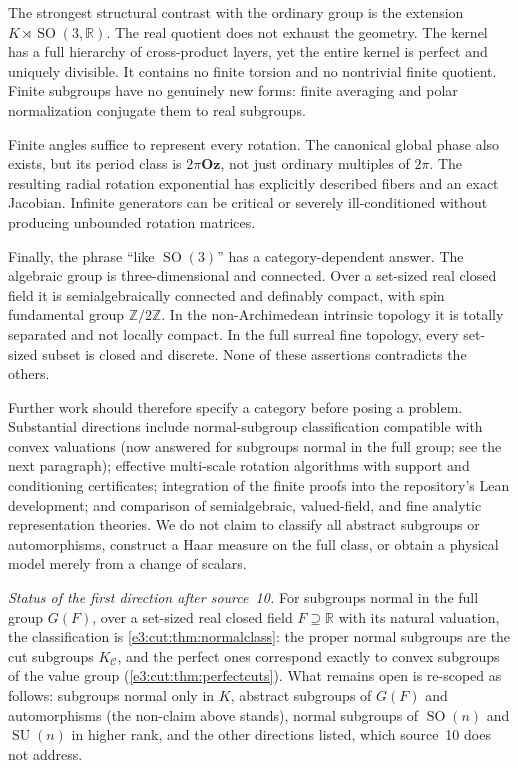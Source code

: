 \documentclass[11pt,letterpaper]{article}
\numberwithin{equation}{section}
\theoremstyle{definition}
\theoremstyle{remark}
\newcommand{\R}{\mathbb R}
\newcommand{\Z}{\mathbb Z}
\newcommand{\Oz}{\mathbf{Oz}}
\newcommand{\SO}{\operatorname{SO}}
\newcommand{\SU}{\operatorname{SU}}
\begin{document}
The strongest structural contrast with the ordinary group is the extension
\(K\rtimes\SO(3,\R)\). The real quotient does not exhaust the geometry.
The kernel has a full hierarchy of cross-product layers, yet the entire kernel
is perfect and uniquely divisible. It contains no finite torsion and no
nontrivial finite quotient. Finite subgroups have no genuinely new forms:
finite averaging and polar normalization conjugate them to real subgroups.

Finite angles suffice to represent every rotation. The canonical global phase
also exists, but its period class is \(2\pi\Oz\), not just ordinary multiples
of \(2\pi\). The resulting radial rotation exponential has explicitly described
fibers and an exact Jacobian. Infinite generators can be critical or severely
ill-conditioned without producing unbounded rotation matrices.

Finally, the phrase ``like \(\SO(3)\)'' has a category-dependent answer. The
algebraic group is three-dimensional and connected. Over a set-sized real closed
field it is semialgebraically connected and definably compact, with spin
fundamental group \(\Z/2\Z\). In the non-Archimedean intrinsic topology it is
totally separated and not locally compact. In the full surreal fine topology,
every set-sized subset is closed and discrete. None of these assertions
contradicts the others.

Further work should therefore specify a category before posing a problem.
Substantial directions include normal-subgroup classification compatible with
convex valuations (now answered for subgroups normal in the full group; see the
next paragraph); effective multi-scale rotation algorithms with support and
conditioning certificates; integration of the finite proofs into the
repository's Lean development; and comparison of semialgebraic, valued-field,
and fine analytic representation theories. We do not claim to classify all
abstract subgroups or automorphisms, construct a Haar measure on the full class,
or obtain a physical model merely from a change of scalars.

\emph{Status of the first direction after source~10.} For subgroups normal in
the full group $G(F)$, over a set-sized real closed field $F\supseteq\R$ with its
natural valuation, the classification is \cref{e3:cut:thm:normalclass}: the
proper normal subgroups are the cut subgroups $K_{\mathcal C}$, and the perfect
ones correspond exactly to convex subgroups of the value group
(\cref{e3:cut:thm:perfectcuts}). What remains open is re-scoped as follows:
subgroups normal only in $K$, abstract subgroups of $G(F)$ and automorphisms
(the non-claim above stands), normal subgroups of $\SO(n)$ and $\SU(n)$ in
higher rank, and the other directions listed, which source~10 does not address.
\end{document}
